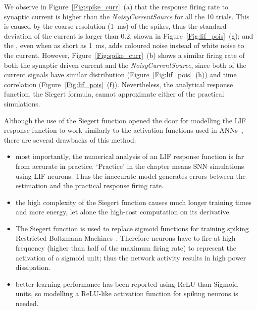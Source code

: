 	We observe in Figure~\ref{Fig:spike_curr}~(a) that the response firing rate to synaptic current is higher than the \textit{NoisyCurrentSource} for all the 10 trials.
	This is caused by the coarse resolution (1~ms) of the spikes, thus the standard deviation of the current is larger than 0.2, shown in Figure~\ref{Fig:lif_pois}~(g);
	and the \DIFdelbegin {}\DIFdelend \DIFaddbegin {}\DIFaddend , even when as short as 1~ms, adds coloured noise instead of white noise to the current.
	However, Figure~\ref{Fig:spike_curr}~(b) shows a similar firing rate of both the synaptic driven current and the \textit{NoisyCurrentSource}, since both of the current signals have similar distribution (Figure~\ref{Fig:lif_pois}~(h)) and time correlation (Figure~\ref{Fig:lif_pois}~(f)).
	Nevertheless, the analytical response function, the Siegert formula, cannot approximate either of the practical simulations.

		Although the use of the Siegert function opened the door for modelling the LIF response function to work similarly to the activation functions used in ANNs~\citep{Jug_etal_2012}, there are several drawbacks of this method:
	\begin{itemize}
		\item most importantly, the numerical analysis of an LIF response function is far from accurate in practice. `Practice' in the chapter means SNN simulations using LIF neurons.
		Thus the inaccurate model generates errors between the estimation and the practical response firing rate.

		
		\item the high complexity of the Siegert function causes much longer training times and more energy, let alone the high-cost computation on its derivative.
		\item The Siegert function is used to replace sigmoid functions for training spiking Restricted Boltzmann Machines~\citep{Jug_etal_2012}.
		Therefore neurons have to fire at high frequency (higher than half of the maximum firing rate) to represent the activation of a sigmoid unit; thus the network activity results in high power dissipation.
		\item better learning performance has been reported using ReLU than Sigmoid units, so modelling a ReLU-like activation function for spiking neurons is needed.  
	\end{itemize}

